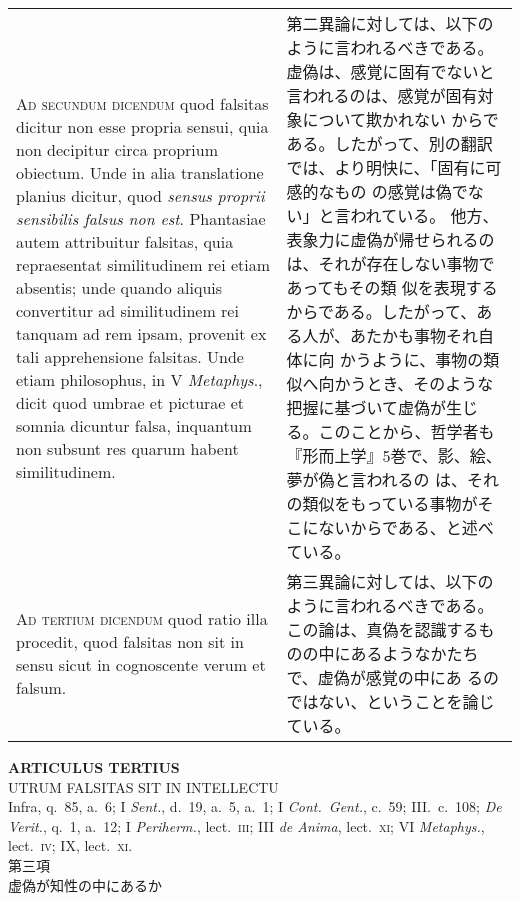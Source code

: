 \documentclass[10pt]{jsarticle} %
\begin{document}
\begin{longtable}{p{21em}p{21em}}
\\


{\scshape Ad secundum dicendum} quod falsitas dicitur non esse propria
sensui, quia non decipitur circa proprium obiectum. Unde in alia
translatione planius dicitur, quod {\itshape sensus proprii sensibilis falsus non
est}. Phantasiae autem attribuitur falsitas, quia repraesentat
similitudinem rei etiam absentis; unde quando aliquis convertitur ad
similitudinem rei tanquam ad rem ipsam, provenit ex tali apprehensione
falsitas. Unde etiam philosophus, in V {\itshape Metaphys}., dicit quod umbrae et
picturae et somnia dicuntur falsa, inquantum non subsunt res quarum
habent similitudinem.


&

第二異論に対しては、以下のように言われるべきである。
虚偽は、感覚に固有でないと言われるのは、感覚が固有対象について欺かれない
 からである。したがって、別の翻訳では、より明快に、「固有に可感的なもの
 の感覚は偽でない」と言われている。
他方、表象力に虚偽が帰せられるのは、それが存在しない事物であってもその類
 似を表現するからである。したがって、ある人が、あたかも事物それ自体に向
 かうように、事物の類似へ向かうとき、そのような把握に基づいて虚偽が生じ
 る。このことから、哲学者も『形而上学』5巻で、影、絵、夢が偽と言われるの
 は、それの類似をもっている事物がそこにないからである、と述べている。

\\


{\scshape Ad tertium dicendum} quod ratio illa procedit, quod falsitas
non sit in sensu sicut in cognoscente verum et falsum.


&

第三異論に対しては、以下のように言われるべきである。
この論は、真偽を認識するものの中にあるようなかたちで、虚偽が感覚の中にあ
 るのではない、ということを論じている。




\end{longtable}
\newpage



\begin{center}
 {\Large {\bf ARTICULUS TERTIUS}}\\
 {\large UTRUM FALSITAS SIT IN INTELLECTU}\\
 {\footnotesize Infra, q.~85, a.~6; I {\itshape Sent.}, d.~19, a.~5,
 a.~1; I {\itshape Cont.~Gent.}, c.~59; III.~c.~108; {\itshape De
 Verit.}, q.~1, a.~12; I {\itshape Periherm.}, lect.~{\scshape iii}; III
 {\itshape de Anima}, lect.~{\scshape xi}; VI {\itshape Metaphys.},
 lect.~{\scshape iv}; IX, lect.~{\scshape xi}.}\\
 {\Large 第三項\\虚偽が知性の中にあるか}
\end{center}
\end{document}
